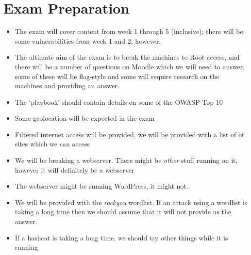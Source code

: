 
\section{Exam Preparation}

\begin{itemize}
    \item The exam will cover content from week 1 through 5 (inclusive); there will be some vulnerabilities from week 1 and 2, however.
    \item The ultimate aim of the exam is to break the machines to Root access, and there will be a number of questions on Moodle which we will need to answer, some of these will be flag-style and some will require research on the machines and providing an answer.
    \item The `playbook' should contain details on some of the OWASP Top 10
    \item Some geolocation will be expected in the exam
    \item Filtered internet access will be provided, we will be provided with a list of of sites which we can access
    \item We will be breaking a webserver. There might be \textit{other} stuff running on it, however it will definitely be a webserver
    \item The webserver might be running WordPress, it might not.
    \item We will be provided with the \textit{rockyou} wordlist. If an attack using a wordlist is taking a long time then we should assume that it will not provide us the answer.
    \item If a hashcat is taking a long time, we should try other things while it is running
\end{itemize}